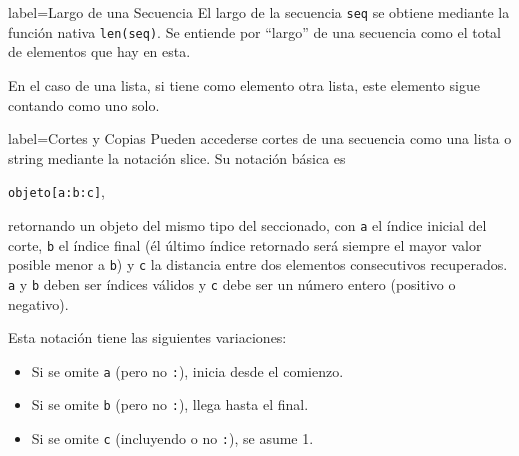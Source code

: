 
\begin{contentbox}{label=Largo de una Secuencia}
    El largo de la secuencia \lstinline!seq! se obtiene mediante la función nativa \lstinline!len(seq)!. Se entiende por ``largo'' de una secuencia como el total de elementos que hay en esta.
    
    En el caso de una lista, si tiene como elemento otra lista, este elemento sigue contando como uno solo.
\end{contentbox}

\begin{contentbox}{label=Cortes y Copias}
    Pueden accederse \alert{cortes} de una secuencia como una lista o string mediante la \alert{notación slice}. Su notación básica es
    \begin{center}
        \lstinline!objeto[a:b:c]!,
    \end{center}
    retornando un objeto del mismo tipo del seccionado, con \lstinline!a! el índice inicial del corte, \lstinline!b! el índice final (él último índice retornado será siempre el mayor valor posible menor a \lstinline!b!) y \lstinline!c! la distancia entre dos elementos consecutivos recuperados. \lstinline!a! y \lstinline!b! deben ser índices válidos y \lstinline!c! debe ser un número entero (positivo o negativo).
    
    Esta notación tiene las siguientes variaciones:
    \begin{itemize}
        \item Si se omite \lstinline!a! (pero no \lstinline!:!), inicia desde el comienzo.
        \item Si se omite \lstinline!b! (pero no \lstinline!:!), llega hasta el final.
        \item Si se omite \lstinline!c! (incluyendo o no \lstinline!:!), se asume 1.
    \end{itemize}
\end{contentbox}


